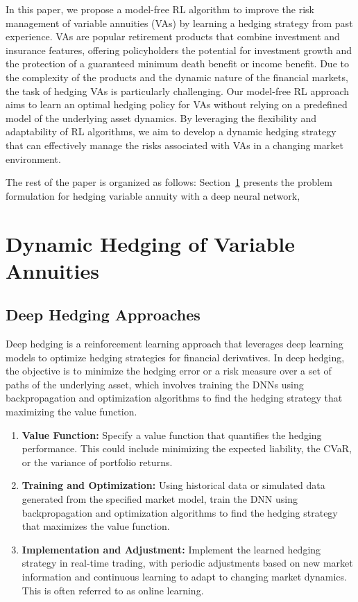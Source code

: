 In this paper, we propose a model-free RL algorithm to improve the risk management of variable annuities (VAs) by learning a hedging strategy from past experience.
VAs are popular retirement products that combine investment and insurance features, offering policyholders the potential for investment growth and the protection of a guaranteed minimum death benefit or income benefit.
Due to the complexity of the products and the dynamic nature of the financial markets, the task of hedging VAs is particularly challenging.
Our model-free RL approach aims to learn an optimal hedging policy for VAs without relying on a predefined model of the underlying asset dynamics.
By leveraging the flexibility and adaptability of RL algorithms, we aim to develop a dynamic hedging strategy that can effectively manage the risks associated with VAs in a changing market environment.

The rest of the paper is organized as follows: Section~\ref{sec3:vaHedging} presents the problem formulation for hedging variable annuity with a deep neural network, 

\section{Dynamic Hedging of Variable Annuities} \label{sec3:vaHedging}


\subsection{Deep Hedging Approaches}

Deep hedging is a reinforcement learning approach that leverages deep learning models to optimize hedging strategies for financial derivatives.
In deep hedging, the objective is to minimize the hedging error or a risk measure over a set of paths of the underlying asset, which involves training the DNNs using backpropagation and optimization algorithms to find the hedging strategy that maximizing the value function.

\begin{enumerate}
    \item \textbf{Value Function:} Specify a value function that quantifies the hedging performance. 
    This could include minimizing the expected liability, the CVaR, or the variance of portfolio returns.
    \item \textbf{Training and Optimization:} Using historical data or simulated data generated from the specified market model, train the DNN using backpropagation and optimization algorithms to find the hedging strategy that maximizes the value function.
    \item \textbf{Implementation and Adjustment:} Implement the learned hedging strategy in real-time trading, with periodic adjustments based on new market information and continuous learning to adapt to changing market dynamics. This is often referred to as online learning.
\end{enumerate}

